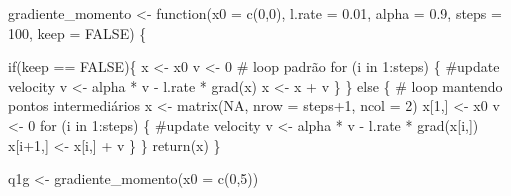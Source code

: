 \documentclass[
  a4paperpaper,
]{article}
\newenvironment{Shaded}{\begin{snugshade}}{\end{snugshade}}
\newcommand{\AttributeTok}[1]{\textcolor[rgb]{0.40,0.45,0.13}{#1}}
\newcommand{\CommentTok}[1]{\textcolor[rgb]{0.37,0.37,0.37}{#1}}
\newcommand{\ConstantTok}[1]{\textcolor[rgb]{0.56,0.35,0.01}{#1}}
\newcommand{\ControlFlowTok}[1]{\textcolor[rgb]{0.00,0.23,0.31}{#1}}
\newcommand{\DecValTok}[1]{\textcolor[rgb]{0.68,0.00,0.00}{#1}}
\newcommand{\FloatTok}[1]{\textcolor[rgb]{0.68,0.00,0.00}{#1}}
\newcommand{\FunctionTok}[1]{\textcolor[rgb]{0.28,0.35,0.67}{#1}}
\newcommand{\NormalTok}[1]{\textcolor[rgb]{0.00,0.23,0.31}{#1}}
\newcommand{\OtherTok}[1]{\textcolor[rgb]{0.00,0.23,0.31}{#1}}
\newcommand{\SpecialCharTok}[1]{\textcolor[rgb]{0.37,0.37,0.37}{#1}}
\begin{document}
\begin{Shaded}
\begin{Highlighting}[]
\NormalTok{gradiente\_momento }\OtherTok{\textless{}{-}} \ControlFlowTok{function}\NormalTok{(}\AttributeTok{x0 =} \FunctionTok{c}\NormalTok{(}\DecValTok{0}\NormalTok{,}\DecValTok{0}\NormalTok{), }\AttributeTok{l.rate =} \FloatTok{0.01}\NormalTok{, }\AttributeTok{alpha =} \FloatTok{0.9}\NormalTok{, }\AttributeTok{steps =} \DecValTok{100}\NormalTok{, }\AttributeTok{keep =} \ConstantTok{FALSE}\NormalTok{) \{}
  
  \ControlFlowTok{if}\NormalTok{(keep }\SpecialCharTok{==} \ConstantTok{FALSE}\NormalTok{)\{}
\NormalTok{    x }\OtherTok{\textless{}{-}}\NormalTok{ x0}
\NormalTok{    v }\OtherTok{\textless{}{-}} \DecValTok{0}
    \CommentTok{\# loop padrão}
    \ControlFlowTok{for}\NormalTok{ (i }\ControlFlowTok{in} \DecValTok{1}\SpecialCharTok{:}\NormalTok{steps) \{}
      \CommentTok{\#update velocity}
\NormalTok{      v }\OtherTok{\textless{}{-}}\NormalTok{ alpha }\SpecialCharTok{*}\NormalTok{ v }\SpecialCharTok{{-}}\NormalTok{ l.rate }\SpecialCharTok{*} \FunctionTok{grad}\NormalTok{(x)}
\NormalTok{      x }\OtherTok{\textless{}{-}}\NormalTok{ x }\SpecialCharTok{+}\NormalTok{ v}
\NormalTok{    \}}
\NormalTok{  \} }\ControlFlowTok{else}\NormalTok{ \{}
    \CommentTok{\# loop mantendo pontos intermediários}
\NormalTok{    x }\OtherTok{\textless{}{-}} \FunctionTok{matrix}\NormalTok{(}\ConstantTok{NA}\NormalTok{, }\AttributeTok{nrow =}\NormalTok{ steps}\SpecialCharTok{+}\DecValTok{1}\NormalTok{, }\AttributeTok{ncol =} \DecValTok{2}\NormalTok{)}
\NormalTok{    x[}\DecValTok{1}\NormalTok{,] }\OtherTok{\textless{}{-}}\NormalTok{ x0}
\NormalTok{    v }\OtherTok{\textless{}{-}} \DecValTok{0}
    \ControlFlowTok{for}\NormalTok{ (i }\ControlFlowTok{in} \DecValTok{1}\SpecialCharTok{:}\NormalTok{steps) \{}
      \CommentTok{\#update velocity}
\NormalTok{      v }\OtherTok{\textless{}{-}}\NormalTok{ alpha }\SpecialCharTok{*}\NormalTok{ v }\SpecialCharTok{{-}}\NormalTok{ l.rate }\SpecialCharTok{*} \FunctionTok{grad}\NormalTok{(x[i,])}
\NormalTok{      x[i}\SpecialCharTok{+}\DecValTok{1}\NormalTok{,] }\OtherTok{\textless{}{-}}\NormalTok{ x[i,] }\SpecialCharTok{+}\NormalTok{ v}
\NormalTok{    \}}
\NormalTok{  \}}
  \FunctionTok{return}\NormalTok{(x)}
\NormalTok{\}}

\NormalTok{q1g }\OtherTok{\textless{}{-}} \FunctionTok{gradiente\_momento}\NormalTok{(}\AttributeTok{x0 =} \FunctionTok{c}\NormalTok{(}\DecValTok{0}\NormalTok{,}\DecValTok{5}\NormalTok{))}


\end{Highlighting}
\end{Shaded}
\end{document}
